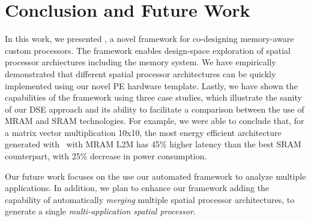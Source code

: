 \section{Conclusion and Future Work}
In this work, we presented \frameworkname, a novel framework for co-designing memory-aware custom processors.
The framework enables design-space exploration of spatial processor archiectures including the memory system. We have empirically demonstrated that different spatial processor architectures can be quickly implemented using our novel PE hardware template. Lastly, we have shown the capabilities of the framework using three case studies, which illustrate the sanity of our DSE approach and its ability to facilitate a comparison between the use of MRAM and SRAM technologies.
For example, we were able to conclude that, for a matrix vector multiplication 10x10, the most energy efficient architecture generated with \frameworkname~with MRAM L2M has 45\% higher latency than the best SRAM counterpart, with 25\% decrease in power consumption.

Our future work focuses on the use our automated framework to analyze multiple applications. In addition, we plan to enhance our framework adding the capability of automatically \textit{merging} multiple spatial processor architectures, to generate a single \textit{multi-application spatial processor}.
